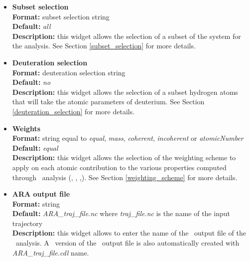 \documentclass[a4paper,11pt]{report}
\begin{document}
\begin{itemize}
\hypertarget{ara_subset_selection}{}
\item \textbf{Subset selection}\\
\textbf{Format:} subset selection string\\
\textbf{Default:} \textit{all}\\
\textbf{Description:} this widget allows the selection of a subset of the system for the analysis. 
See Section \ref{subset_selection} for more details.

\hypertarget{ara_deuteration_selection}{}
\item \textbf{Deuteration selection}\\
\textbf{Format:} deuteration selection string\\
\textbf{Default:} \textit{no}\\
\textbf{Description:} this widget allows the selection of a subset hydrogen atoms that will take the atomic parameters 
of deuterium. See Section \ref{deuteration_selection} for more details.

\hypertarget{ara_weights}{}
\item \textbf{Weights}\\
\textbf{Format:} string equal to \textit{equal}, \textit{mass}, \textit{coherent}, \textit{incoherent} or \textit{atomicNumber}\\
\textbf{Default:} \textit{equal}\\
\textbf{Description:} this widget allows the selection of the weighting scheme to apply on each atomic contribution 
to the various properties computed through \ARA\ analysis (\MSD , \VACF , \DOS ,). See Section \ref{weighting_scheme} for more 
details. 

\hypertarget{ara_ara_output_file}{}
\item \textbf{ARA output file}\\
\textbf{Format:} string\\
\textbf{Default:} \textit{ARA\_traj\_file.nc} where \textit{traj\_file.nc} is the name of the input trajectory\\
\textbf{Description:} this widget allows to enter the name of the \NetCDF\ output file of the \ARA\ analysis. A \CDL\ 
version of the \NetCDF\ output file is also automatically created with \textit{ARA\_traj\_file.cdl} name.
\end{itemize}
\end{document}
